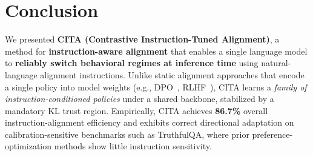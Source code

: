 







\vspace{-1mm}
\section{Conclusion}
\label{sec:conclusion}

We presented \textbf{CITA (Contrastive Instruction-Tuned Alignment)}, a method for \textbf{instruction-aware alignment} that enables a single language model to \textbf{reliably switch behavioral regimes at inference time} using natural-language alignment instructions. Unlike static alignment approaches that encode a single policy into model weights (e.g., DPO~\cite{rafailov2023direct}, RLHF~\cite{ouyang2022training}), \textsc{CITA} learns a \emph{family of instruction-conditioned policies} under a shared backbone, stabilized by a mandatory KL trust region. Empirically, \textsc{CITA} achieves \textbf{86.7\%} overall instruction-alignment efficiency and exhibits correct directional adaptation on calibration-sensitive benchmarks such as TruthfulQA, where prior preference-optimization methods show little instruction sensitivity.

